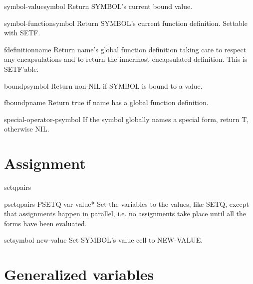 \documentclass[10pt,english]{book}
\begin{document}
\begin{accessor}{symbol-value}{symbol}
  Return SYMBOL's current bound value.
\end{accessor}

\begin{accessor}{symbol-function}{symbol}
  Return SYMBOL's current function definition. Settable with SETF.
\end{accessor}

\begin{accessor}{fdefinition}{name}
  Return name's global function definition taking care to respect any
   encapsulations and to return the innermost encapsulated definition.
   This is SETF'able.
\end{accessor}

\begin{function}{boundp}{symbol}
  Return non-NIL if SYMBOL is bound to a value.
\end{function}

\begin{function}{fboundp}{name}
  Return true if name has a global function definition.
\end{function}

\begin{function}{special-operator-p}{symbol}
  If the symbol globally names a special form, return T, otherwise NIL.
\end{function}

\section{Assignment}
\label{sec:assignment}

\begin{specialop}{setq}{\rest pairs}
\end{specialop}

\begin{macro}{psetq}{\rest pairs}
  PSETQ {var value}*
   Set the variables to the values, like SETQ, except that assignments
   happen in parallel, i.e. no assignments take place until all the
   forms have been evaluated.
\end{macro}

\begin{function}{set}{symbol new-value}
  Set SYMBOL's value cell to NEW-VALUE.
\end{function}

\section{Generalized variables}
\label{sec:gener-vari}
\end{document}
